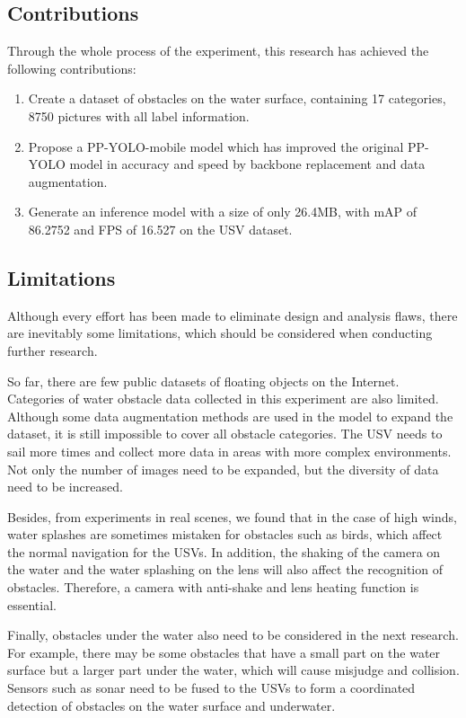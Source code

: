 \documentclass[sensors,article,submit,moreauthors,pdftex]{Definitions/mdpi}
\begin{document}
\begin{paracol}{2}
\subsection{Contributions}
Through the whole process of the experiment, this research has achieved the following contributions:

\begin{enumerate}

\item Create a dataset of obstacles on the water surface, containing 17 categories, 8750 pictures with all label information.
\item Propose a PP-YOLO-mobile model which has improved the original PP-YOLO model in accuracy and speed by backbone replacement and data augmentation.
\item Generate an inference model with a size of only 26.4MB, with mAP of 86.2752 and FPS of 16.527 on the USV dataset.

\end{enumerate}

\subsection{Limitations}
Although every effort has been made to eliminate design and analysis flaws, there are inevitably some limitations, which should be considered when conducting further research.

So far, there are few public datasets of floating objects on the Internet. Categories of water obstacle data collected in this experiment are also limited. Although some data augmentation methods are used in the model to expand the dataset, it is still impossible to cover all obstacle categories. The USV needs to sail more times and collect more data in areas with more complex environments. Not only the number of images need to be expanded, but the diversity of data need to be increased.

Besides, from experiments in real scenes, we found that in the case of high winds, water splashes are sometimes mistaken for obstacles such as birds, which affect the normal navigation for the USVs. In addition, the shaking of the camera on the water and the water splashing on the lens will also affect the recognition of obstacles. Therefore, a camera with anti-shake and lens heating function is essential.

Finally, obstacles under the water also need to be considered in the next research. For example, there may be some obstacles that have a small part on the water surface but a larger part under the water, which will cause misjudge and collision. Sensors such as sonar need to be fused to the USVs to form a coordinated detection of obstacles on the water surface and underwater.



\end{paracol}
\end{document}
